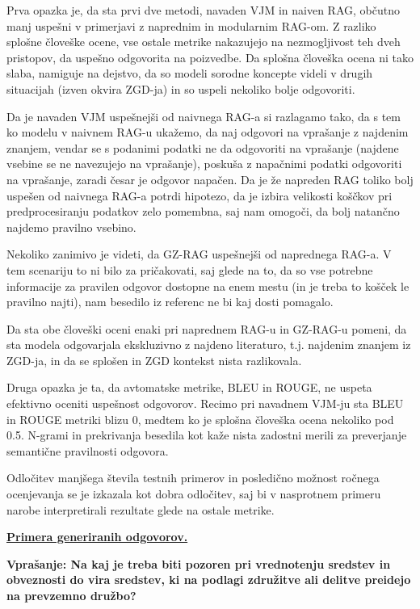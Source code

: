 \documentclass[a4paper,12pt,openright]{book}
\begin{document}
Prva opazka je, da sta prvi dve metodi, navaden VJM in naiven RAG, občutno manj uspešni v primerjavi z naprednim in modularnim RAG-om. Z razliko splošne človeške ocene, vse ostale metrike nakazujejo na nezmogljivost teh dveh pristopov, da uspešno odgovorita na poizvedbe. Da splošna človeška ocena ni tako slaba, namiguje na dejstvo, da so modeli sorodne koncepte videli v drugih situacijah (izven okvira ZGD-ja) in so uspeli nekoliko bolje odgovoriti.

Da je navaden VJM uspešnejši od naivnega RAG-a si razlagamo tako, da s tem ko modelu v naivnem RAG-u ukažemo, da naj odgovori na vprašanje z najdenim znanjem, vendar se s podanimi podatki ne da odgovoriti na vprašanje (najdene vsebine se ne navezujejo na vprašanje), poskuša z napačnimi podatki odgovoriti na vprašanje, zaradi česar je odgovor napačen. Da je že napreden RAG toliko bolj uspešen od naivnega RAG-a potrdi hipotezo, da je izbira velikosti koščkov pri predprocesiranju podatkov zelo pomembna, saj nam omogoči, da bolj natančno najdemo pravilno vsebino.

Nekoliko zanimivo je videti, da GZ-RAG uspešnejši od naprednega RAG-a. V tem scenariju to ni bilo za pričakovati, saj glede na to, da so vse potrebne informacije za pravilen odgovor dostopne na enem mestu (in je treba to košček le pravilno najti), nam besedilo iz referenc ne bi kaj dosti pomagalo.

Da sta obe človeški oceni enaki pri naprednem RAG-u in GZ-RAG-u pomeni, da sta modela odgovarjala ekskluzivno z najdeno literaturo, t.j. najdenim znanjem iz ZGD-ja, in da se splošen in ZGD kontekst nista razlikovala.

Druga opazka je ta, da avtomatske metrike, BLEU in ROUGE, ne uspeta efektivno oceniti uspešnost odgovorov. Recimo pri navadnem VJM-ju sta BLEU in ROUGE metriki blizu 0, medtem ko je splošna človeška ocena nekoliko pod 0.5. N-grami in prekrivanja besedila kot kaže nista zadostni merili za preverjanje semantične pravilnosti odgovora.

Odločitev manjšega števila testnih primerov in posledično možnost ročnega ocenjevanja se je izkazala kot dobra odločitev, saj bi v nasprotnem primeru narobe interpretirali rezultate glede na ostale metrike.

\underline{\textbf{Primera generiranih odgovorov.}}

\textbf{Vprašanje: Na kaj je treba biti pozoren pri vrednotenju sredstev in obveznosti do vira sredstev, ki na podlagi združitve ali delitve preidejo na prevzemno družbo?}
\end{document}
